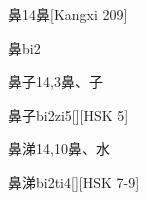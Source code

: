 \begin{Entry}{鼻}{14}{⿐}[Kangxi 209]
  \begin{Phonetics}{鼻}{bi2}
  \end{Phonetics}
\end{Entry}

\begin{Entry}{鼻子}{14,3}{⿐、⼦}
  \begin{Phonetics}{鼻子}{bi2zi5}[][HSK 5]
  \end{Phonetics}
\end{Entry}

\begin{Entry}{鼻涕}{14,10}{⿐、⽔}
  \begin{Phonetics}{鼻涕}{bi2ti4}[][HSK 7-9]
  \end{Phonetics}
\end{Entry}


